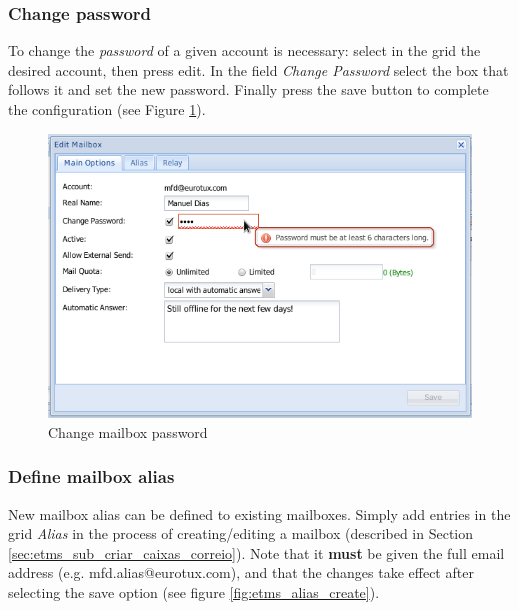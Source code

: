 \subsubsection{Change password}
\label{sec:etms_sub_password_caixas_correio}
To change the \textit{password} of a given account is necessary: select in the grid the desired account, then press edit. In the field \textit{Change Password} select the box that follows it and set the new password. Finally press the save button to complete the configuration (see Figure \ref{fig:etms_mb_pass_ed}).

\begin{figure}[H]
    \begin{center}
    \includegraphics[scale=0.45]{screenshots/etms/etms_mb_pass_ed.png}
    \caption{Change mailbox password}
    \label{fig:etms_mb_pass_ed}
    \end{center}
\end{figure}

\subsubsection{Define mailbox alias}
\label{sec:etms_sub_alias_caixas_correio}
New mailbox alias can be defined to existing mailboxes. Simply add entries in the grid \textit{Alias} in the process of creating/editing a mailbox (described in Section \ref{sec:etms_sub_criar_caixas_correio}). Note that it \textbf{must} be given the full email address (e.g. mfd.alias@eurotux.com), and that the changes take effect after selecting the save option (see figure \ref{fig:etms_alias_create}).

